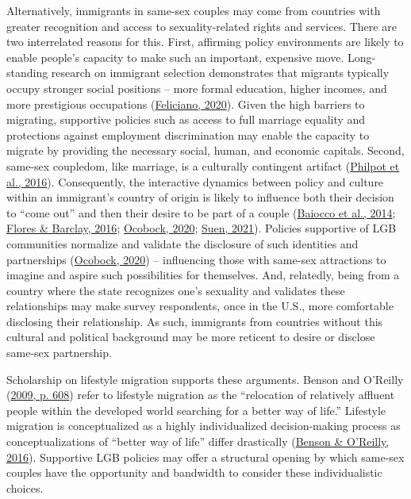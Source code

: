 \documentclass[
  12pt,
]{article}
\begin{document}
Alternatively, immigrants in same-sex couples may come from countries with greater recognition and access to sexuality-related rights and services. There are two interrelated reasons for this. First, affirming policy environments are likely to enable people's capacity to make such an important, expensive move. Long-standing research on immigrant selection demonstrates that migrants typically occupy stronger social positions -- more formal education, higher incomes, and more prestigious occupations (\protect\hyperlink{ref-feliciano_2020}{Feliciano, 2020}). Given the high barriers to migrating, supportive policies such as access to full marriage equality and protections against employment discrimination may enable the capacity to migrate by providing the necessary social, human, and economic capitals. Second, same-sex coupledom, like marriage, is a culturally contingent artifact (\protect\hyperlink{ref-philpot_2016_gay}{Philpot et al., 2016}). Consequently, the interactive dynamics between policy and culture within an immigrant's country of origin is likely to influence both their decision to ``come out'' and then their desire to be part of a couple (\protect\hyperlink{ref-baiocco_2014_desire}{Baiocco et al., 2014}; \protect\hyperlink{ref-flores_2016_backlash}{Flores \& Barclay, 2016}; \protect\hyperlink{ref-ocobock_2020_leveraging}{Ocobock, 2020}; \protect\hyperlink{ref-suen_2021_sexual}{Suen, 2021}). Policies supportive of LGB communities normalize and validate the disclosure of such identities and partnerships (\protect\hyperlink{ref-ocobock_2020_leveraging}{Ocobock, 2020}) -- influencing those with same-sex attractions to imagine and aspire such possibilities for themselves. And, relatedly, being from a country where the state recognizes one's sexuality and validates these relationships may make survey respondents, once in the U.S., more comfortable disclosing their relationship. As such, immigrants from countries without this cultural and political background may be more reticent to desire or disclose same-sex partnership.

Scholarship on lifestyle migration supports these arguments. Benson and O'Reilly (\protect\hyperlink{ref-benson_2009}{2009, p. 608}) refer to lifestyle migration as the ``relocation of relatively affluent people within the developed world searching for a better way of life.'' Lifestyle migration is conceptualized as a highly individualized decision-making process as conceptualizations of ``better way of life'' differ drastically (\protect\hyperlink{ref-benson_2016}{Benson \& O'Reilly, 2016}). Supportive LGB policies may offer a structural opening by which same-sex couples have the opportunity and bandwidth to consider these individualistic choices.
\end{document}
